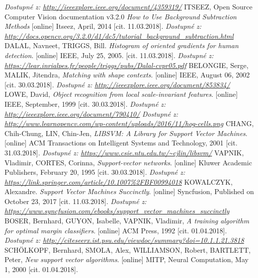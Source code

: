 \begin{thebibliography}{99}
 		\textit{Dostupné z: \url{http://ieeexplore.ieee.org/document/4359319/}}
	ITSEEZ, Open Source Computer Vision documentation v3.2.0 \textit{How to Use Background Subtraction Methods} [online] Itseez, April, 2014 [cit. 11.03.2018].
		\textit{Dostupné z: \url{http://docs.opencv.org/3.2.0/d1/dc5/tutorial_background_subtraction.html}}
	 {DALAL, Navneet, TRIGGS, Bill. \textit{Histogram of oriented gradients for human detection}. [online] IEEE, July 25, 2005. [cit. 11.03.2018].
		\textit{Dostupné z: \url{https://lear.inrialpes.fr/people/triggs/pubs/Dalal-cvpr05.pdf}}}
	 BELONGIE, Serge, MALIK, Jitendra, \textit{Matching with shape contexts}. [online] IEEE, August 06, 2002 [cit. 30.03.2018]. 
 		\textit{Dostupné z: \url{http://ieeexplore.ieee.org/document/853834/}}
 	 LOWE, David, \textit{Object recognition from local scale-invariant features}. [online] IEEE, September, 1999 [cit. 30.03.2018]. 
 		\textit{Dostupné z: \url{http://ieeexplore.ieee.org/document/790410/}}
	 \textit{Dostupné z: \url{http://www.learnopencv.com/wp-content/uploads/2016/11/hog-cells.png}}
	 CHANG, Chih-Chung, LIN, Chin-Jen, \textit{LIBSVM: A Library for Support Vector Machines}. [online] ACM Transactions on Intelligent Systems and Technology, 2001 [cit. 31.03.2018]. 
 		\textit{Dostupné z: \url{https://www.csie.ntu.edu.tw/~cjlin/libsvm/}}
	 VAPNIK, Vladimir, CORTES, Corinna, \textit{Support-vector networks}. [online] Kluwer Academic Publishers, February 20, 1995 [cit. 30.03.2018]. 
 		\textit{Dostupné z: \url{https://link.springer.com/article/10.1007\%2FBF00994018}}
	 KOWALCZYK, Alexandre.  \textit{Support Vector Machines Succinctly}.  [online] Syncfusion, Published on October 23, 2017 [cit. 11.03.2018]. 
		\textit{Dostupné z: \url{https://www.syncfusion.com/ebooks/support_vector_machines_succinctly}}
	 BOSER, Bernhard, GUYON, Isabelle, VAPNIK, Vladimir, \textit{A training algorithm for optimal margin classifiers}. [online] ACM Press, 1992 [cit. 01.04.2018]. 
 		\textit{Dostupné z: \url{http://citeseerx.ist.psu.edu/viewdoc/summary?doi=10.1.1.21.3818}}
 	 SCHÖLKOPF, Bernhard, SMOLA, Alex, WILLIAMSON, Robert, BARTLETT, Peter, \textit{New support vector algorithms}. [online] MITP, Neural Computation, May 1, 2000 [cit. 01.04.2018]. 

\end{thebibliography}
